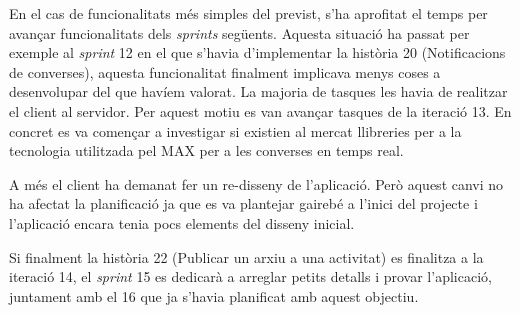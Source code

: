 En el cas de funcionalitats més simples del previst, s'ha aprofitat el temps per avançar funcionalitats dels \textit{sprints} següents. Aquesta situació ha passat per exemple al \textit{sprint} 12 en el que s'havia d'implementar la història 20 (Notificacions de converses), aquesta funcionalitat finalment implicava menys coses a desenvolupar del que havíem valorat. La majoria de tasques les havia de realitzar el client al servidor. Per aquest motiu es van avançar tasques de la iteració 13. En concret es va començar a investigar si existien al mercat llibreries per a la tecnologia utilitzada pel MAX per a les converses en temps real.

A més el client ha demanat fer un re-disseny de l'aplicació. Però aquest canvi no ha afectat la planificació ja que es va plantejar gairebé a l'inici del projecte i l'aplicació encara tenia pocs elements del disseny inicial.

Si finalment la història 22 (Publicar un arxiu a una activitat) es finalitza a la iteració 14, el \textit{sprint} 15 es dedicarà a arreglar petits detalls i provar l'aplicació, juntament amb el 16 que ja s'havia planificat amb aquest objectiu.

